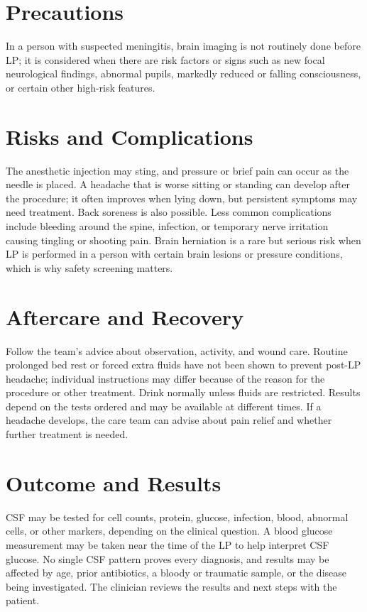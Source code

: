 \section*{Precautions}
In a person with suspected meningitis, brain imaging is not routinely done before LP; it is considered when there are risk factors or signs such as new focal neurological findings, abnormal pupils, markedly reduced or falling consciousness, or certain other high-risk features.

\section*{Risks and Complications}
The anesthetic injection may sting, and pressure or brief pain can occur as the needle is placed. A headache that is worse sitting or standing can develop after the procedure; it often improves when lying down, but persistent symptoms may need treatment. Back soreness is also possible. Less common complications include bleeding around the spine, infection, or temporary nerve irritation causing tingling or shooting pain. Brain herniation is a rare but serious risk when LP is performed in a person with certain brain lesions or pressure conditions, which is why safety screening matters.

\section*{Aftercare and Recovery}
Follow the team's advice about observation, activity, and wound care. Routine prolonged bed rest or forced extra fluids have not been shown to prevent post-LP headache; individual instructions may differ because of the reason for the procedure or other treatment. Drink normally unless fluids are restricted. Results depend on the tests ordered and may be available at different times. If a headache develops, the care team can advise about pain relief and whether further treatment is needed.

\section*{Outcome and Results}
CSF may be tested for cell counts, protein, glucose, infection, blood, abnormal cells, or other markers, depending on the clinical question. A blood glucose measurement may be taken near the time of the LP to help interpret CSF glucose. No single CSF pattern proves every diagnosis, and results may be affected by age, prior antibiotics, a bloody or traumatic sample, or the disease being investigated. The clinician reviews the results and next steps with the patient.

